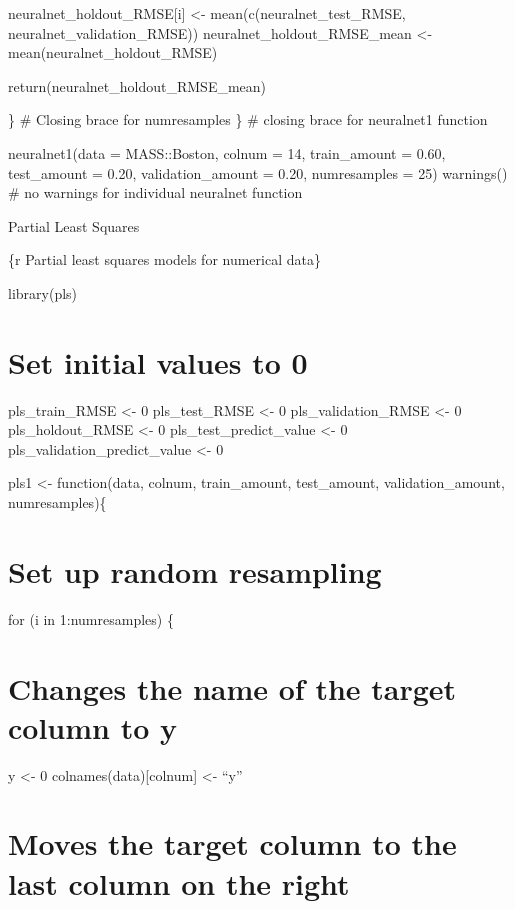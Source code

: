 \documentclass[
]{book}
\begin{document}
neuralnet\_holdout\_RMSE{[}i{]} \textless- mean(c(neuralnet\_test\_RMSE,
neuralnet\_validation\_RMSE)) neuralnet\_holdout\_RMSE\_mean \textless-
mean(neuralnet\_holdout\_RMSE)

return(neuralnet\_holdout\_RMSE\_mean)

\} \# Closing brace for numresamples \} \# closing brace for neuralnet1
function

neuralnet1(data = MASS::Boston, colnum = 14, train\_amount = 0.60,
test\_amount = 0.20, validation\_amount = 0.20, numresamples = 25)
warnings() \# no warnings for individual neuralnet function

Partial Least Squares

\{r Partial least squares models for numerical data\}

library(pls)

\chapter{Set initial values to 0}\label{set-initial-values-to-0-12}

pls\_train\_RMSE \textless- 0 pls\_test\_RMSE \textless- 0 pls\_validation\_RMSE \textless- 0
pls\_holdout\_RMSE \textless- 0 pls\_test\_predict\_value \textless- 0
pls\_validation\_predict\_value \textless- 0

pls1 \textless- function(data, colnum, train\_amount, test\_amount,
validation\_amount, numresamples)\{

\chapter{Set up random resampling}\label{set-up-random-resampling-10}

for (i in 1:numresamples) \{

\chapter{Changes the name of the target column to y}\label{changes-the-name-of-the-target-column-to-y-10}

y \textless- 0 colnames(data){[}colnum{]} \textless- ``y''

\chapter{Moves the target column to the last column on the right}\label{moves-the-target-column-to-the-last-column-on-the-right-10}
\end{document}
